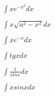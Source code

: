 \documentclass{article}
\begin{document}
$
\int xe^{-x^2}dx
$

$
\int x\sqrt{a^2-x^2}dx
$

$
\int xe^{-x}dx
$

$
\int tgxdx
$

$
\int \frac{1}{xlnx}dx
$

$
\int xsinxdx
$
\end{document}
